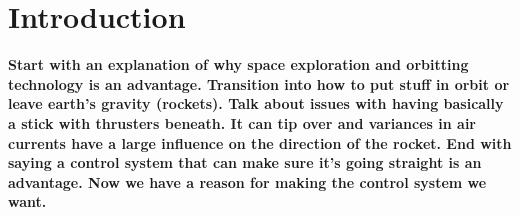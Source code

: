 \chapter{Introduction}
\textbf{Start with an explanation of why space exploration and orbitting technology is an advantage. Transition into how to put stuff in orbit or leave earth's gravity (rockets). Talk about issues with having basically a stick with thrusters beneath. It can tip over and variances in air currents have a large influence on the direction of the rocket. End with saying a control system that can make sure it's going straight is an advantage. Now we have a reason for making the control system we want.}


